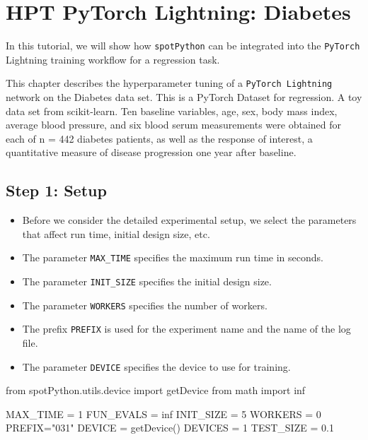 \documentclass[
  letterpaper,
  DIV=11,
  numbers=noendperiod]{scrreprt}
\newenvironment{Shaded}{\begin{snugshade}}{\end{snugshade}}
\newcommand{\DecValTok}[1]{\textcolor[rgb]{0.68,0.00,0.00}{#1}}
\newcommand{\FloatTok}[1]{\textcolor[rgb]{0.68,0.00,0.00}{#1}}
\newcommand{\ImportTok}[1]{\textcolor[rgb]{0.00,0.46,0.62}{#1}}
\newcommand{\NormalTok}[1]{\textcolor[rgb]{0.00,0.23,0.31}{#1}}
\newcommand{\OperatorTok}[1]{\textcolor[rgb]{0.37,0.37,0.37}{#1}}
\newcommand{\StringTok}[1]{\textcolor[rgb]{0.13,0.47,0.30}{#1}}
\providecommand{\tightlist}{%
  \setlength{\itemsep}{0pt}\setlength{\parskip}{0pt}}\usepackage{longtable,booktabs,array}
\begin{document}
\chapter{HPT PyTorch Lightning:
Diabetes}\label{hpt-pytorch-lightning-diabetes}

In this tutorial, we will show how \texttt{spotPython} can be integrated
into the \texttt{PyTorch} Lightning training workflow for a regression
task.

This chapter describes the hyperparameter tuning of a
\texttt{PyTorch\ Lightning} network on the Diabetes data set. This is a
PyTorch Dataset for regression. A toy data set from scikit-learn. Ten
baseline variables, age, sex, body mass index, average blood pressure,
and six blood serum measurements were obtained for each of n = 442
diabetes patients, as well as the response of interest, a quantitative
measure of disease progression one year after baseline.

\section{Step 1: Setup}\label{sec-setup-31}

\begin{itemize}
\tightlist
\item
  Before we consider the detailed experimental setup, we select the
  parameters that affect run time, initial design size, etc.
\item
  The parameter \texttt{MAX\_TIME} specifies the maximum run time in
  seconds.
\item
  The parameter \texttt{INIT\_SIZE} specifies the initial design size.
\item
  The parameter \texttt{WORKERS} specifies the number of workers.
\item
  The prefix \texttt{PREFIX} is used for the experiment name and the
  name of the log file.
\item
  The parameter \texttt{DEVICE} specifies the device to use for
  training.
\end{itemize}

\begin{Shaded}
\begin{Highlighting}[]
\ImportTok{from}\NormalTok{ spotPython.utils.device }\ImportTok{import}\NormalTok{ getDevice}
\ImportTok{from}\NormalTok{ math }\ImportTok{import}\NormalTok{ inf}

\NormalTok{MAX\_TIME }\OperatorTok{=} \DecValTok{1}
\NormalTok{FUN\_EVALS }\OperatorTok{=}\NormalTok{ inf}
\NormalTok{INIT\_SIZE }\OperatorTok{=} \DecValTok{5}
\NormalTok{WORKERS }\OperatorTok{=} \DecValTok{0}
\NormalTok{PREFIX}\OperatorTok{=}\StringTok{"031"}
\NormalTok{DEVICE }\OperatorTok{=}\NormalTok{ getDevice()}
\NormalTok{DEVICES }\OperatorTok{=} \DecValTok{1}
\NormalTok{TEST\_SIZE }\OperatorTok{=} \FloatTok{0.1}
\end{Highlighting}
\end{Shaded}
\end{document}

